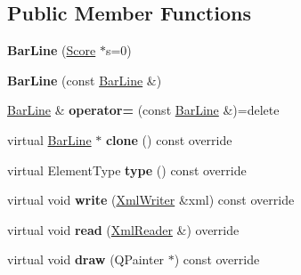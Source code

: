 \subsection*{Public Member Functions}
\begin{DoxyCompactItemize}
\item 
\mbox{\label{class_ms_1_1_bar_line_afdcbe4cd068d5b1865f2d0aa41a4d12f}} 
{\bfseries Bar\+Line} (\hyperlink{class_ms_1_1_score}{Score} $\ast$s=0)
\item 
\mbox{\label{class_ms_1_1_bar_line_a3e502f6b5521ab7592f711c0de0a25d2}} 
{\bfseries Bar\+Line} (const \hyperlink{class_ms_1_1_bar_line}{Bar\+Line} \&)
\item 
\mbox{\label{class_ms_1_1_bar_line_a86e0bcd2d3e39e81dcc7b75ef6472eb9}} 
\hyperlink{class_ms_1_1_bar_line}{Bar\+Line} \& {\bfseries operator=} (const \hyperlink{class_ms_1_1_bar_line}{Bar\+Line} \&)=delete
\item 
\mbox{\label{class_ms_1_1_bar_line_a95135598fee8b7ba59c03b8956066411}} 
virtual \hyperlink{class_ms_1_1_bar_line}{Bar\+Line} $\ast$ {\bfseries clone} () const override
\item 
\mbox{\label{class_ms_1_1_bar_line_a0a87059305a3b7c84e3b75c08357ac94}} 
virtual Element\+Type {\bfseries type} () const override
\item 
\mbox{\label{class_ms_1_1_bar_line_a62f772fbeedb531ea6766b5a47cdc10e}} 
virtual void {\bfseries write} (\hyperlink{class_ms_1_1_xml_writer}{Xml\+Writer} \&xml) const override
\item 
\mbox{\label{class_ms_1_1_bar_line_a1970bfb8297c3eb039b8f169a567609c}} 
virtual void {\bfseries read} (\hyperlink{class_ms_1_1_xml_reader}{Xml\+Reader} \&) override
\item 
\mbox{\label{class_ms_1_1_bar_line_a5a0e6d1ac28fce745667793d84cc8289}} 
virtual void {\bfseries draw} (Q\+Painter $\ast$) const override
\item 
\mbox{\label{class_ms_1_1_bar_line_ab5d9ab51d253ccfcc5b393ce58fff42b}} 

\end{DoxyCompactItemize}
